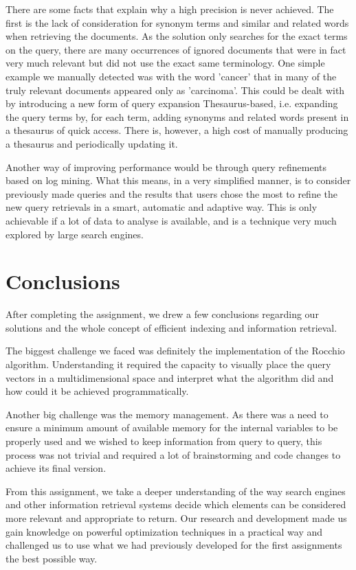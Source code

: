 \documentclass[12pt]{article}
\begin{document}
There are some facts that explain why a high precision is never achieved.
The first is the lack of consideration for synonym terms and similar and related 
words when retrieving the documents.
As the solution only searches for the exact terms on the query, there are many
occurrences of ignored documents that were in fact very much relevant but did not
use the exact same terminology.
One simple example we manually detected was with the word 'cancer' that in many 
of the truly relevant documents appeared only as 'carcinoma'.
This could be dealt with by introducing a new form of query expansion Thesaurus-based,
i.e. expanding the query terms by, for each term, adding synonyms and related words
present in a thesaurus of quick access.
There is, however, a high cost of manually producing a thesaurus and periodically 
updating it.

Another way of improving performance would be through query refinements based on
log mining.
What this means, in a very simplified manner, is to consider previously made
queries and the results that users chose the most to refine the new query retrievals
in a smart, automatic and adaptive way.
This is only achievable if a lot of data to analyse is available, and is a technique
very much explored by large search engines.

\section{Conclusions}

After completing the assignment, we drew a few conclusions regarding our
solutions and the whole concept of efficient indexing and information retrieval.

The biggest challenge we faced was definitely the implementation of the Rocchio 
algorithm.
Understanding it required the capacity to visually place the query vectors in a 
multidimensional space and interpret what the algorithm did and how could it be 
achieved programmatically. 

Another big challenge was the memory management.
As there was a need to ensure a minimum amount of available memory for the internal
variables to be properly used and we wished to keep information from query to query,
this process was not trivial and required a lot of brainstorming and code changes 
to achieve its final version.

From this assignment, we take a deeper understanding of the way search engines 
and other information retrieval systems decide which elements can be considered
more relevant and appropriate to return.
Our research and development made us gain knowledge on powerful optimization 
techniques in a practical way and challenged us to use what we had previously
developed for the first assignments the best possible way.
\end{document}
